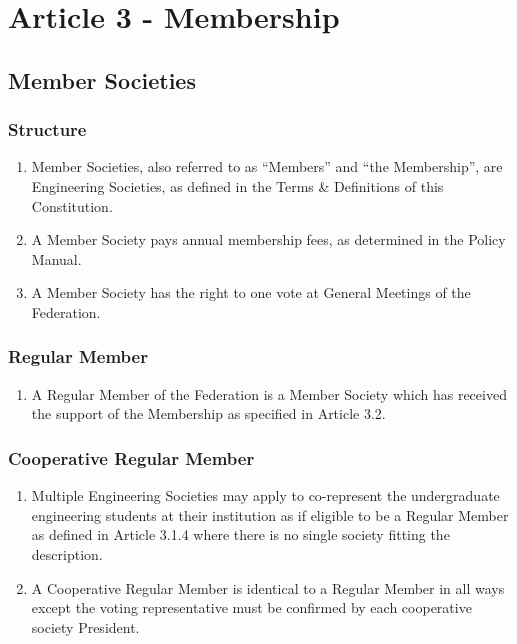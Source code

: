 \section{Article 3 - Membership}
\label{article-3-membership}

\subsection{Member Societies}
\label{member-societies}

\subsubsection{Structure}
\label{member-structure}
\begin{enumerate}
 \item Member Societies, also referred to as “Members” and “the Membership”, are Engineering Societies, as defined in the Terms \& Definitions of this Constitution.
 \item A Member Society pays annual membership fees, as determined in the Policy Manual.
 \item A Member Society has the right to one vote at General Meetings of the Federation.
\end{enumerate}

\subsubsection{Regular Member}
\label{regular-member-engineering-society}

\begin{enumerate}
 \item A Regular Member of the Federation is a Member Society which has received the support of the Membership as specified in Article 3.2.
\end{enumerate}

\subsubsection{Cooperative Regular Member}
\label{cooperative-regular-member}

\begin{enumerate}
 \item Multiple Engineering Societies may apply to co-represent the undergraduate engineering students at their institution as if eligible to be a Regular Member as defined in Article 3.1.4 where there is no single society fitting the description.
 \item A Cooperative Regular Member is identical to a Regular Member in all ways except the voting representative must be confirmed by each cooperative society President.
\end{enumerate}

